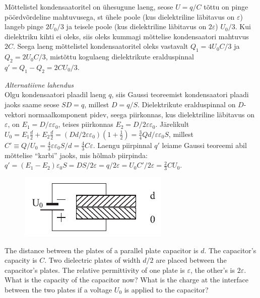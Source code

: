 {Mõttelistel kondensaatoritel on ühesugune laeng, seose $U=q/C$ tõttu on pinge pöördvõrdeline mahtuvusega, st ühele poole (kus dielektriline läbitavus  on $\varepsilon$) langeb pinge $2U_0/3$ ja teisele poole (kus dielektriline läbitavus on $2\varepsilon$) $U_0/3$. Kui dielektriku kihti ei oleks, siis oleks kummagi mõttelise kondensaatori mahtuvus $2C$. Seega laeng mõttelistel kondensaatoritel oleks vastavalt $Q_1=4U_0C/3$ ja $Q_2=2U_0C/3$, mistõttu kogulaeng dielektrikute eralduspinnal $q'=Q_1-Q_2=2CU_0/3$.
\vspace{0.5\baselineskip}

\emph{Alternatiivne lahendus}\\
Olgu kondensaatori plaadil laeng $q$, siis Gaussi teoreemist kondensaatori plaadi jaoks saame seose $SD=q$, millest $D=q/S$. Dielektrikute eralduspinnal on $D$-vektori normaalkomponent pidev, seega piirkonnas, kus dielektriline läbitavus on $\varepsilon$, on $E_1=D/\varepsilon\varepsilon_0$, teises piirkonnas $E_2=D/2\varepsilon\varepsilon_0$. Järelikult $U_0=E_1\frac d2+E_2\frac d2=(Dd/2\varepsilon\varepsilon_0)(1+\frac 12)=\frac 34Qd/\varepsilon\varepsilon_0S$, millest $C'\equiv Q/U_0=\frac 43\varepsilon\varepsilon_0S/d=\frac 43C\varepsilon$. Laengu piirpinnal $q'$ leiame Gaussi teoreemi abil mõttelise \enquote{karbi} jaoks, mis hõlmab piirpinda: $q'=(E_1-E_2)\varepsilon_0S=DS/2\varepsilon=q/2\varepsilon=U_0C'/2\varepsilon=\frac 23CU_0$.
\fi


\ifEngStatement
\begin{figure}
	\vspace{-13pt}
	\includegraphics[width=\linewidth]{2017-lahg-07-res-cap2}
\end{figure}
The distance between the plates of a parallel plate capacitor is $d$. The capacitor’s capacity is $C$. Two dielectric plates of width $d/2$ are placed between the capacitor’s plates. The relative permittivity of one plate is $\varepsilon$, the other’s is $2\varepsilon$. What is the capacity of the capacitor now? What is the charge at the interface between the two plates if a voltage $U_0$ is applied to the capacitor?
\fi


}
